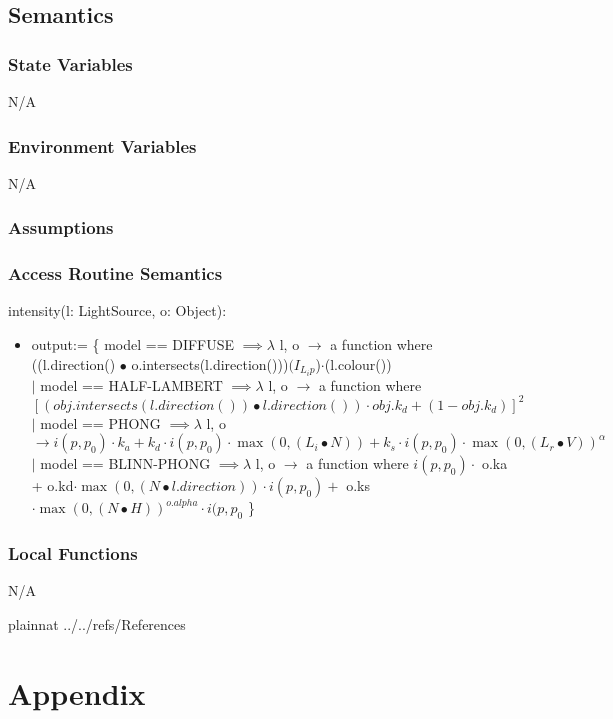 \documentclass[12pt, titlepage]{article}
\begin{document}
\subsection{Semantics}
\subsubsection{State Variables}
N/A
\subsubsection{Environment Variables}
N/A

\subsubsection{Assumptions}

\subsubsection{Access Routine Semantics}
\noindent intensity(l: LightSource, o: Object):
\begin{itemize}
	\item output:= \{ model == DIFFUSE $\implies \lambda$ l, o $\to$ a function 
	where ((l.direction() $\bullet$ 
	o.intersects(l.direction()))$(I_{L_{i}p}$)$\cdot$(l.colour())\\
	$|$ model == HALF-LAMBERT $\implies \lambda$ l, o $\to$ a function 
	where  $[(obj.intersects(l.direction()) \bullet l.direction())\cdot 
	obj.k_{d} + (1-obj.k_{d})]^2$\\
	$|$ model == PHONG $\implies \lambda$ l, o $\to i(p,p_{0}) \cdot k_{a} + 
	k_{d}\cdot i(p,p_{0}) \cdot 
	\max(0,(L_{i}\bullet N)) + k_{s}\cdot i(p,p_{0}) \cdot \max(0, 
	({L_{r}}\bullet V))^\alpha$\\
	$|$ model == BLINN-PHONG $\implies \lambda$ l, o $\to$ a function where 
	$i(p,p_{0}) \cdot$ o.ka + o.kd$\cdot \max(0, (N \bullet 
	l.direction))\cdot i(p,p_{0}) +$ o.ks $\cdot \max(0, (N \bullet 
	H))^{o.alpha} \cdot	i(p,p_{0}$
	\}
\end{itemize} 

\subsubsection{Local Functions}
N/A

\newpage

 {plainnat}
 {../../refs/References}

\newpage

\section{Appendix} \label{Appendix}

\end{document}
